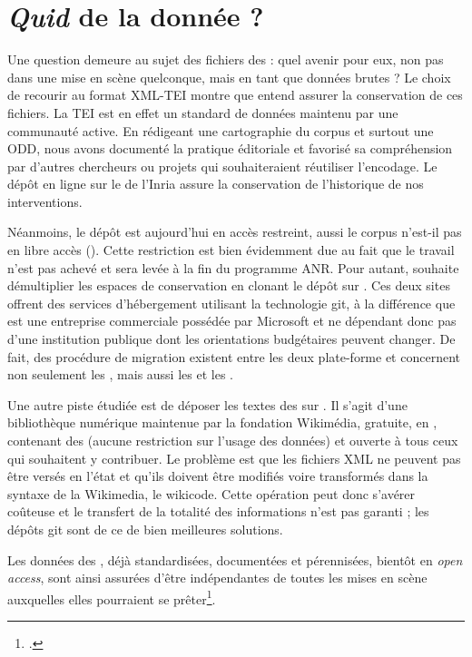 \section{\textit{Quid} de la donnée ?}

Une question demeure au sujet des fichiers des \odm{} : quel avenir pour eux, non pas dans une mise en scène quelconque, mais en tant que données brutes ? Le choix de recourir au format XML-TEI montre que \timeus{} entend assurer la conservation de ces fichiers. La TEI est en effet un standard de données maintenu par une communauté active. En rédigeant une cartographie du corpus et surtout une ODD, nous avons documenté la pratique éditoriale et favorisé sa compréhension par d'autres chercheurs ou projets qui souhaiteraient réutiliser l'encodage. Le dépôt en ligne sur le \gitlab{} de l'Inria assure la conservation de l'historique de nos interventions.

Néanmoins, le dépôt \gitlab{} est aujourd'hui en accès restreint, aussi le corpus n'est-il pas en libre accès (\openaccess). Cette restriction est bien évidemment due au fait que le travail n'est pas achevé et sera levée à la fin du programme ANR. Pour autant, \timeus{} souhaite démultiplier les espaces de conservation en clonant le dépôt \gitlab{} sur \github. Ces deux sites offrent des services d'hébergement utilisant la technologie git, à la différence que \github{} est une entreprise commerciale possédée par Microsoft et ne dépendant donc pas d'une institution publique dont les orientations budgétaires peuvent changer. De fait, des procédure de migration existent entre les deux plate-forme et concernent non seulement les \commits{}, mais aussi les \issues{} et les \mergerequests.

Une autre piste étudiée est de déposer les textes des \odm{} sur \wikisource. Il s'agit d'une bibliothèque numérique maintenue par la fondation Wikimédia, gratuite, en \openaccess, contenant des \opendata{} (aucune restriction sur l'usage des données) et ouverte à tous ceux qui souhaitent y contribuer. Le problème est que les fichiers XML ne peuvent pas être versés en l'état et qu'ils doivent être modifiés voire transformés dans la syntaxe de la Wikimedia, le wikicode. Cette opération peut donc s'avérer coûteuse et le transfert de la totalité des informations n'est pas garanti ; les dépôts git sont de ce \pov{} de bien meilleures solutions.

Les données des \odm, déjà standardisées, documentées et pérennisées, bientôt en \textit{open access}, sont ainsi assurées d'être indépendantes de toutes les mises en scène auxquelles elles pourraient se prêter\footcite[p. 63]{jolivet}.


